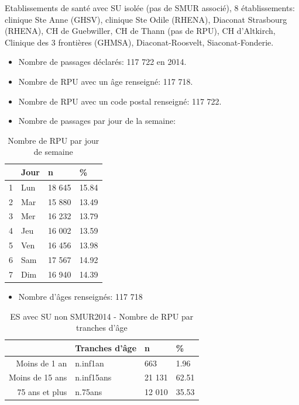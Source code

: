 \documentclass[]{article}
\begin{document}
Etablissements de santé avec SU isolée (pas de SMUR associé), 8
établissements: clinique Ste Anne (GHSV), clinique Ste Odile (RHENA),
Diaconat Strasbourg (RHENA), CH de Guebwiller, CH de Thann (pas de RPU),
CH d'Altkirch, Clinique des 3 frontières (GHMSA), Diaconat-Roosvelt,
Siaconat-Fonderie.

\begin{itemize}
\itemsep1pt\parskip0pt
\item
  Nombre de passages déclarés: 117 722 en 2014.
\item
  Nombre de RPU avec un âge renseigné: 117 718.
\item
  Nombre de RPU avec un code postal renseigné: 117 722.
\item
  Nombre de passages par jour de la semaine:
\end{itemize}

\begin{table}[ht]
\centering
\begin{tabular}{rlll}
  \hline
 & Jour & n & \% \\ 
  \hline
1 & Lun & 18 645 & 15.84 \\ 
  2 & Mar & 15 880 & 13.49 \\ 
  3 & Mer & 16 232 & 13.79 \\ 
  4 & Jeu & 16 002 & 13.59 \\ 
  5 & Ven & 16 456 & 13.98 \\ 
  6 & Sam & 17 567 & 14.92 \\ 
  7 & Dim & 16 940 & 14.39 \\ 
   \hline
\end{tabular}
\caption{Nombre de RPU par jour de semaine} 
\end{table}

\begin{itemize}
\itemsep1pt\parskip0pt
\item
  Nombre d'âges renseignés: 117 718
\end{itemize}

\begin{table}[ht]
\centering
\begin{tabular}{rlll}
  \hline
 & Tranches d'âge & n & \% \\ 
  \hline
Moins de 1 an & n.inf1an &    663 & 1.96 \\ 
  Moins de 15 ans & n.inf15ans & 21 131 & 62.51 \\ 
  75 ans et plus & n.75ans & 12 010 & 35.53 \\ 
   \hline
\end{tabular}
\caption{ES avec SU non SMUR2014 - Nombre de RPU par tranches d'âge} 
\end{table}
\end{document}
